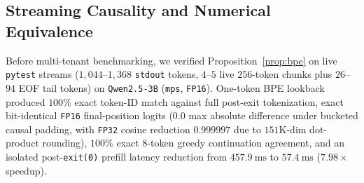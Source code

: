\documentclass[10pt,journal,compsoc]{IEEEtran}
\theoremstyle{definition}
\theoremstyle{remark}
\begin{document}
\subsection{Streaming Causality and Numerical Equivalence}
Before multi-tenant benchmarking, we verified Proposition~\ref{prop:bpe} on live \texttt{pytest} streams ($1{,}044$--$1{,}368$ \texttt{stdout} tokens, $4$--$5$ live $256$-token chunks plus $26$--$94$ EOF tail tokens) on \texttt{Qwen2.5-3B} (\texttt{mps}, \texttt{FP16}). One-token BPE lookback produced $100\%$ exact token-ID match against full post-exit tokenization, exact bit-identical \texttt{FP16} final-position logits ($0.0$ max absolute difference under bucketed causal padding, with \texttt{FP32} cosine reduction $0.999997$ due to $151\mathrm{K}$-dim dot-product rounding), $100\%$ exact $8$-token greedy continuation agreement, and an isolated post-\texttt{exit(0)} prefill latency reduction from $457.9~\mathrm{ms}$ to $57.4~\mathrm{ms}$ ($7.98\times$ speedup).
\end{document}
